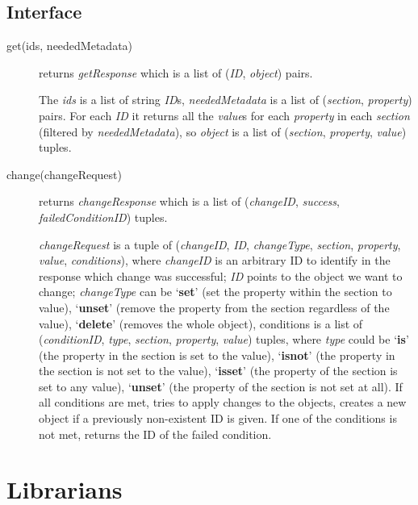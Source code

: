 \documentclass{book}
\begin{document}

\subsection{Interface} %

\begin{description}
    \item [get(ids, neededMetadata)] returns \emph{getResponse} which is a list of (\emph{ID}, \emph{object}) pairs.

    The \emph{ids} is a list of string \emph{ID}s, \emph{neededMetadata} is a list of (\emph{section}, \emph{property}) pairs. For each \emph{ID} it returns all the \emph{value}s for each \emph{property} in each \emph{section} (filtered by \emph{neededMetadata}), so \emph{object} is a list of (\emph{section}, \emph{property}, \emph{value}) tuples.

    \item [change(changeRequest)] returns \emph{changeResponse} which is a list of (\emph{changeID}, \emph{success}, \emph{failedConditionID}) tuples.

    \emph{changeRequest} is a tuple of (\emph{changeID}, \emph{ID}, \emph{changeType}, \emph{section}, \emph{property}, \emph{value}, \emph{conditions}), where \emph{changeID} is an arbitrary ID to identify in the response which change was successful; \emph{ID} points to the object we want to change; \emph{changeType} can be `\textbf{set}' (set the property within the section to value), `\textbf{unset}' (remove the property from the section regardless of the value), `\textbf{delete}' (removes the whole object), conditions is a list of (\emph{conditionID}, \emph{type}, \emph{section}, \emph{property}, \emph{value}) tuples, where \emph{type} could be `\textbf{is}' (the property in the section is set to the value), `\textbf{isnot}' (the property in the section is not set to the value), `\textbf{isset}' (the property of the section is set to any value), `\textbf{unset}' (the property of the section is not set at all).
    If all conditions are met, tries to apply changes to the objects, creates a new object if a previously non-existent ID is given. If one of the conditions is not met, returns the ID of the failed condition.
\end{description}
    

\newpage

\section{Librarians} %
\label{sec:librarian}
\end{document}
